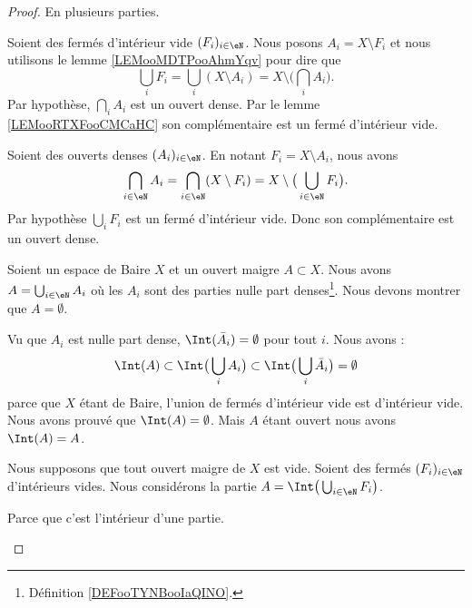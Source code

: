 \begin{proof}
	En plusieurs parties.
	\begin{subproof}

		Soient des fermés d'intérieur vide \( (F_i)_{i\in \eN}\). Nous posons \( A_i=X\setminus F_i\) et nous utilisons le lemme \ref{LEMooMDTPooAhmYqv} pour dire que
		\begin{equation}
			\bigcup_iF_i=\bigcup_i(X\setminus A_i)=X\setminus\big( \bigcap_iA_i \big).
		\end{equation}
		Par hypothèse, \( \bigcap_iA_i\) est un ouvert dense. Par le lemme \ref{LEMooRTXFooCMCaHC} son complémentaire est un fermé d'intérieur vide.

		Soient des ouverts denses \( (A_i)_{i\in \eN}\). En notant \( F_i=X\setminus A_i\), nous avons
		\begin{equation}
			\bigcap_{i\in \eN} A_i=\bigcap_{i\in \eN}(X\setminus F_i)=X\setminus\big( \bigcup_{i\in \eN}F_i \big).
		\end{equation}
		Par hypothèse \( \bigcup_iF_i\) est un fermé d'intérieur vide. Donc son complémentaire est un ouvert dense.

		Soient un espace de Baire \( X\) et un ouvert maigre \( A\subset X\). Nous avons \( A=\bigcup_{i\in \eN}A_i\) où les \( A_i\) sont des parties nulle part denses\footnote{Définition \ref{DEFooTYNBooIaQINO}.}. Nous devons montrer que \( A=\emptyset\).

		Vu que \( A_i\) est nulle part dense, \( \Int(\bar A_i)=\emptyset\) pour tout \( i\). Nous avons :
		\begin{equation}
			\Int(A)\subset\Int\big( \bigcup_iA_i \big)\subset\Int\big( \bigcup_{i}\bar A_i \big)=\emptyset
		\end{equation}
		parce que \( X\) étant de Baire, l'union de fermés d'intérieur vide est d'intérieur vide. Nous avons prouvé que \( \Int(A)=\emptyset\). Mais \( A\) étant ouvert nous avons \( \Int(A)=A\).

		Nous supposons que tout ouvert maigre de \( X\) est vide. Soient des fermés \( (F_i)_{i\in \eN}\) d'intérieurs vides. Nous considérons la partie \( A= \Int\big( \bigcup_{i\in \eN}F_i \big)\).
		\begin{subproof}
			Parce que c'est l'intérieur d'une partie.


\end{subproof}
\end{subproof}
\end{proof}
